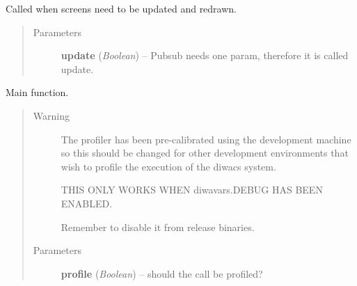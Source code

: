 \documentclass[letterpaper,10pt,english]{sphinxmanual}
\begin{document}
\begin{fulllineitems}
\begin{fulllineitems}
\begin{quote}
\begin{description}
\end{description}\end{quote}

\end{fulllineitems}


\begin{fulllineitems}
\label{diwacs:diwacs.GraphicalUserInterface.UpdateScreens}
Called when screens need to be updated and redrawn.
\begin{quote}\begin{description}
\item[{Parameters}] \leavevmode
\textbf{update} (\emph{Boolean}) -- Pubsub needs one param, therefore it is called update.

\end{description}\end{quote}

\end{fulllineitems}


\end{fulllineitems}


\begin{fulllineitems}
\label{diwacs:diwacs.main}
Main function.
\begin{quote}\begin{description}
\item[{Warning }] \leavevmode
The profiler has been pre-calibrated using the development machine
so this should be changed for other development environments that
wish to profile the execution of the diwacs system.

THIS ONLY WORKS WHEN diwavars.DEBUG HAS BEEN ENABLED.

Remember to disable it from release binaries.

\item[{Parameters}] \leavevmode
\textbf{profile} (\emph{Boolean}) -- should the call be profiled?

\end{description}\end{quote}

\end{fulllineitems}

\end{document}
